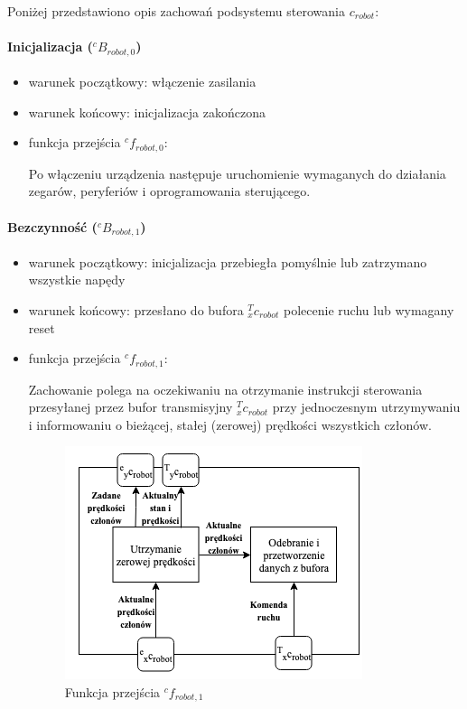 \documentclass[a4paper, 12pt, twoside]{article}
\begin{document}
Poniżej przedstawiono opis zachowań podsystemu sterowania $c_{robot}$:

\paragraph{Inicjalizacja ($^cB_{robot,0}$)}

\begin{itemize}
\item warunek początkowy: włączenie zasilania
\item warunek końcowy: inicjalizacja zakończona
\item funkcja przejścia $^cf_{robot,0}$:

Po włączeniu urządzenia następuje uruchomienie wymaganych do działania zegarów, peryferiów i oprogramowania sterującego.
\end{itemize}

\paragraph{Bezczynność ($^cB_{robot,1}$)}

\begin{itemize}
\item warunek początkowy: inicjalizacja przebiegła pomyślnie lub zatrzymano wszystkie napędy
\item warunek końcowy: przesłano do bufora $^T_xc_{robot}$ polecenie ruchu lub wymagany reset
\item funkcja przejścia $^cf_{robot,1}$:

Zachowanie polega na oczekiwaniu na otrzymanie instrukcji sterowania przesyłanej przez bufor transmisyjny $^T_xc_{robot}$ przy jednoczesnym utrzymywaniu i informowaniu o bieżącej, stałej (zerowej) prędkości wszystkich członów.

\begin{figure}[hbt!]
\centering
\includegraphics[width=0.5\linewidth]{images/state_idle.png}
\caption{Funkcja przejścia $^cf_{robot,1}$ }
\label{fig:state_idle}
\end{figure}

\end{itemize}
\end{document}

